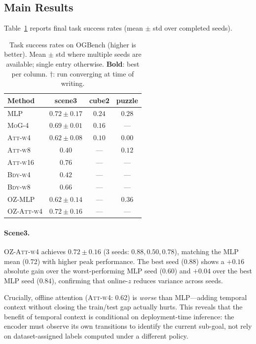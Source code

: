\documentclass{article}
\begin{document}
\subsection{Main Results}
\label{sec:main}

Table~\ref{tab:main} reports final task success rates
(mean $\pm$ std over completed seeds).

\begin{table}[t]
\centering
\caption{Task success rates on OGBench (higher is better).
Mean $\pm$ std where multiple seeds are available;
single entry otherwise.
\textbf{Bold}: best per column.
$\dag$: run converging at time of writing.}
\label{tab:main}
\setlength{\tabcolsep}{5pt}
\begin{tabular}{lccc}
\toprule
\textbf{Method} & \textbf{scene3} & \textbf{cube2} & \textbf{puzzle} \\
\midrule
\textsc{MLP}       & $0.72 \pm 0.17$ & $0.24$ & $0.28$ \\
\textsc{MoG-4}     & $0.69 \pm 0.01$ & $0.16$ & --- \\
\textsc{Att-w4}    & $0.62 \pm 0.08$ & $0.10$ & $0.00$ \\
\textsc{Att-w8}    & $0.40$          & ---    & $0.12$ \\
\textsc{Att-w16}   & $0.76$          & ---    & --- \\
\textsc{Bdy-w4}    & $0.42$          & ---    & --- \\
\textsc{Bdy-w8}    & $0.66$          & ---    & --- \\
\midrule
\textsc{OZ-MLP}    & $0.62 \pm 0.14$ & ---    & $0.36$ \\
\textsc{OZ-Att-w4} & $\mathbf{0.72 \pm 0.16}$ & ---    & --- \\
\bottomrule
\end{tabular}
\end{table}

\paragraph{Scene3.}
\textsc{OZ-Att-w4} achieves $0.72 \pm 0.16$ (3 seeds:
$0.88, 0.50, 0.78$), matching the \textsc{MLP} mean (0.72)
with higher peak performance.
The best seed ($0.88$) shows a $+0.16$ absolute gain over
the worst-performing \textsc{MLP} seed ($0.60$) and $+0.04$
over the best MLP seed ($0.84$), confirming that online-$z$
reduces variance across seeds.

Crucially, offline attention (\textsc{Att-w4}: 0.62) is
\emph{worse} than \textsc{MLP}—adding temporal context without
closing the train/test gap actually hurts.
This reveals that the benefit of temporal context is conditional
on deployment-time inference: the encoder must observe its own
transitions to identify the current sub-goal, not rely on
dataset-assigned labels computed under a different policy.
\end{document}
